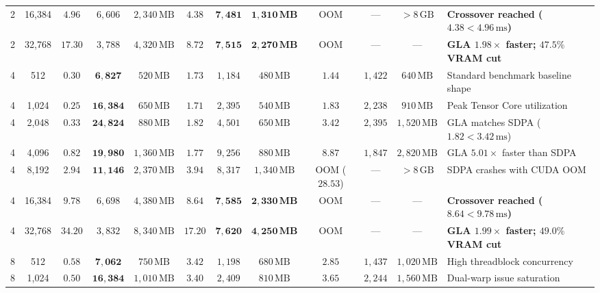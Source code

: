 \begin{table}[t]
{\begin{tabular}{cc ccc ccc ccc l}
2 & 16,384 & $4.96$          & $6{,}606$          & $2{,}340\,\text{MB}$ & $\mathbf{4.38}$ & $\mathbf{7{,}481}$ & $\mathbf{1{,}310\,\text{MB}}$ & OOM & — & $>8\,\text{GB}$ & \textbf{Crossover reached ($4.38 < 4.96\,\text{ms}$)} \\
2 & 32,768 & $17.30$         & $3{,}788$          & $4{,}320\,\text{MB}$ & $\mathbf{8.72}$ & $\mathbf{7{,}515}$ & $\mathbf{2{,}270\,\text{MB}}$ & OOM & — & — & \textbf{GLA $1.98\times$ faster; $47.5\%$ VRAM cut} \\
\midrule
4 & 512    & $\mathbf{0.30}$ & $\mathbf{6{,}827}$  & $520\,\text{MB}$ & $1.73$ & $1{,}184$ & $480\,\text{MB}$ & $1.44$ & $1{,}422$ & $640\,\text{MB}$ & Standard benchmark baseline shape \\
4 & 1,024  & $\mathbf{0.25}$ & $\mathbf{16{,}384}$ & $650\,\text{MB}$ & $1.71$ & $2{,}395$ & $540\,\text{MB}$ & $1.83$ & $2{,}238$ & $910\,\text{MB}$ & Peak Tensor Core utilization \\
4 & 2,048  & $\mathbf{0.33}$ & $\mathbf{24{,}824}$ & $880\,\text{MB}$ & $1.82$ & $4{,}501$ & $650\,\text{MB}$ & $3.42$ & $2{,}395$ & $1{,}520\,\text{MB}$ & GLA matches SDPA ($1.82 < 3.42\,\text{ms}$) \\
4 & 4,096  & $\mathbf{0.82}$ & $\mathbf{19{,}980}$ & $1{,}360\,\text{MB}$ & $1.77$ & $9{,}256$ & $880\,\text{MB}$ & $8.87$ & $1{,}847$ & $2{,}820\,\text{MB}$ & GLA $5.01\times$ faster than SDPA \\
4 & 8,192  & $\mathbf{2.94}$ & $\mathbf{11{,}146}$ & $2{,}370\,\text{MB}$ & $3.94$ & $8{,}317$ & $1{,}340\,\text{MB}$ & OOM ($28.53$) & — & $>8\,\text{GB}$ & SDPA crashes with CUDA OOM \\
4 & 16,384 & $9.78$          & $6{,}698$          & $4{,}380\,\text{MB}$ & $\mathbf{8.64}$ & $\mathbf{7{,}585}$ & $\mathbf{2{,}330\,\text{MB}}$ & OOM & — & — & \textbf{Crossover reached ($8.64 < 9.78\,\text{ms}$)} \\
4 & 32,768 & $34.20$         & $3{,}832$          & $8{,}340\,\text{MB}$ & $\mathbf{17.20}$ & $\mathbf{7{,}620}$ & $\mathbf{4{,}250\,\text{MB}}$ & OOM & — & — & \textbf{GLA $1.99\times$ faster; $49.0\%$ VRAM cut} \\
\midrule
8 & 512    & $\mathbf{0.58}$ & $\mathbf{7{,}062}$  & $750\,\text{MB}$ & $3.42$ & $1{,}198$ & $680\,\text{MB}$ & $2.85$ & $1{,}437$ & $1{,}020\,\text{MB}$ & High threadblock concurrency \\
8 & 1,024  & $\mathbf{0.50}$ & $\mathbf{16{,}384}$ & $1{,}010\,\text{MB}$ & $3.40$ & $2{,}409$ & $810\,\text{MB}$ & $3.65$ & $2{,}244$ & $1{,}560\,\text{MB}$ & Dual-warp issue saturation \\

\end{tabular}}
\end{table}

